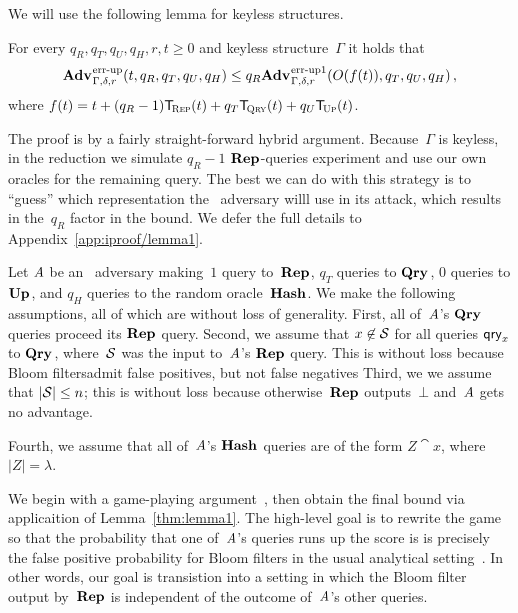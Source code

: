 We will use the following lemma for keyless structures.
%

\begin{lemma}\label{thm:lemma1}
  For every $q_R, q_T, q_U, q_H, r, t \geq 0$ and keyless structure~$\Gamma$ it
  holds that
  \begin{equation*}
    \Adv{\errep}_{\Gamma,\delta,r}(t, q_R, q_T, q_U, q_H) \leq
    q_R\Adv{\errep1}_{\Gamma,\delta,r}(O(f(t)), q_T, q_U, q_H) \,,
  \end{equation*}
  where $f(t) = t + (q_R-1)\ticks(\Rep,t) + q_T\ticks(\Qry,t) + q_U\ticks(\Up,t)$.
\end{lemma}
%
%
\noindent
The proof is by a fairly straight-forward hybrid argument. Because~$\Gamma$ is
keyless, in the reduction we simulate $q_R-1$ $\textup{\textbf{Rep}}\hspace{0.5pt}$-queries experiment and use
our own oracles for the remaining query. The best we can do with this strategy
is to ``guess'' which representation the \errep\ adversary willl use in its
attack, which results in the~$q_R$ factor in the bound.
%
We defer the full details to Appendix~\ref{app:iproof/lemma1}.

Let $\mathit{A}$ be an \errep\ adversary making~$1$ query to~$\textup{\textbf{Rep}}\hspace{0.5pt}$, $q_T$ queries
to $\textup{\textbf{Qry}}\hspace{0.5pt}$, $0$ queries to $\textup{\textbf{Up}}\hspace{0.5pt}$, and $q_H$ queries to the random
oracle~$\textup{\textbf{Hash}}\hspace{0.5pt}$.
%
We make the following assumptions, all of which are without loss of generality.
%
First, all of~$\mathit{A}$'s $\textup{\textbf{Qry}}\hspace{0.5pt}$ queries proceed its $\textup{\textbf{Rep}}\hspace{0.5pt}$ query.
%
Second, we assume that $x\not\in\mathcal{S}$ for all queries $\mathsf{qry}_x$ to $\textup{\textbf{Qry}}\hspace{0.5pt}$,
where~$\mathcal{S}$ was the input to~$\mathit{A}$'s $\textup{\textbf{Rep}}\hspace{0.5pt}$ query. This is without loss
because Bloom filtersadmit false positives, but not false negatives
%
Third, we we assume that $|\mathcal{S}| \leq n$; this is without loss because
otherwise~$\textup{\textbf{Rep}}\hspace{0.5pt}$ outputs~$\bot$ and~$\mathit{A}$ gets no advantage.

Fourth, we assume that all of~$\mathit{A}$'s $\textup{\textbf{Hash}}\hspace{0.5pt}$ queries are of the form $Z\cat
x$, where $|Z| = \lambda$.

We begin with a game-playing argument~\cite{bellare2006triple}, then obtain the
final bound via applicaition of Lemma~\ref{thm:lemma1}.
%
%
The high-level goal is to rewrite the game so that the probability that one
of~$\mathit{A}$'s queries runs up the score is is precisely the false positive
probability for Bloom filters in the usual analytical
setting~\cite{kirsch2006less}. In other words, our goal is transistion into a
setting in which the Bloom filter output by~$\textup{\textbf{Rep}}\hspace{0.5pt}$ is independent of the
outcome of~$\mathit{A}$'s other queries.

